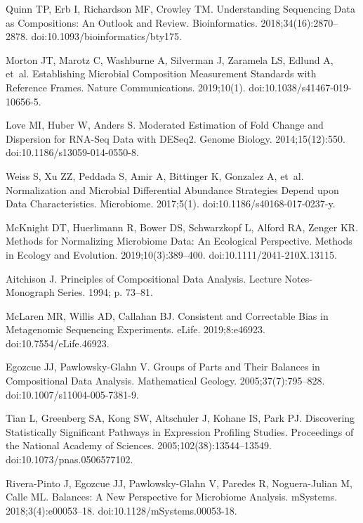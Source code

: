 \documentclass[10pt,letterpaper]{article}
\begin{document}
\begin{thebibliography}{10}
Quinn TP, Erb I, Richardson MF, Crowley TM.
\newblock Understanding Sequencing Data as Compositions: An Outlook and Review.
\newblock Bioinformatics. 2018;34(16):2870--2878.
\newblock doi:{10.1093/bioinformatics/bty175}.

Morton JT, Marotz C, Washburne A, Silverman J, Zaramela LS, Edlund A, et~al.
\newblock Establishing Microbial Composition Measurement Standards with
  Reference Frames.
\newblock Nature Communications. 2019;10(1).
\newblock doi:{10.1038/s41467-019-10656-5}.

Love MI, Huber W, Anders S.
\newblock Moderated Estimation of Fold Change and Dispersion for {{RNA}}-Seq
  Data with {{DESeq2}}.
\newblock Genome Biology. 2014;15(12):550.
\newblock doi:{10.1186/s13059-014-0550-8}.

Weiss S, Xu ZZ, Peddada S, Amir A, Bittinger K, Gonzalez A, et~al.
\newblock Normalization and Microbial Differential Abundance Strategies Depend
  upon Data Characteristics.
\newblock Microbiome. 2017;5(1).
\newblock doi:{10.1186/s40168-017-0237-y}.

McKnight DT, Huerlimann R, Bower DS, Schwarzkopf L, Alford RA, Zenger KR.
\newblock Methods for Normalizing Microbiome Data: An Ecological Perspective.
\newblock Methods in Ecology and Evolution. 2019;10(3):389--400.
\newblock doi:{10.1111/2041-210X.13115}.

Aitchison J.
\newblock Principles of Compositional Data Analysis.
\newblock Lecture Notes-Monograph Series. 1994; p. 73--81.

McLaren MR, Willis AD, Callahan BJ.
\newblock Consistent and Correctable Bias in Metagenomic Sequencing
  Experiments.
\newblock eLife. 2019;8:e46923.
\newblock doi:{10.7554/eLife.46923}.

Egozcue JJ, {Pawlowsky-Glahn} V.
\newblock Groups of {{Parts}} and {{Their Balances}} in {{Compositional Data
  Analysis}}.
\newblock Mathematical Geology. 2005;37(7):795--828.
\newblock doi:{10.1007/s11004-005-7381-9}.

Tian L, Greenberg SA, Kong SW, Altschuler J, Kohane IS, Park PJ.
\newblock Discovering Statistically Significant Pathways in Expression
  Profiling Studies.
\newblock Proceedings of the National Academy of Sciences.
  2005;102(38):13544--13549.
\newblock doi:{10.1073/pnas.0506577102}.

{Rivera-Pinto} J, Egozcue JJ, {Pawlowsky-Glahn} V, Paredes R, {Noguera-Julian}
  M, Calle ML.
\newblock Balances: A {{New Perspective}} for {{Microbiome Analysis}}.
\newblock mSystems. 2018;3(4):e00053--18.
\newblock doi:{10.1128/mSystems.00053-18}.


\end{thebibliography}
\end{document}
